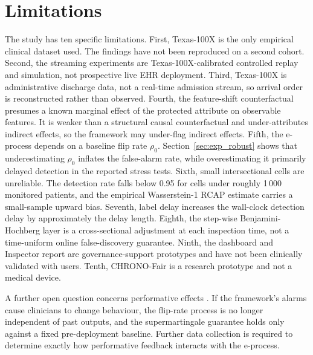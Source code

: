 \documentclass[acmsmall,nonacm,review,anonymous]{acmart}
\newcommand{\1}[1]{\mathbf{1}\!\left\{#1\right\}}
\begin{document}
\section{Limitations}\label{sec:limitations}

The study has ten specific limitations. First, Texas-100X is the only empirical clinical dataset used. The findings have not been reproduced on a second cohort. Second, the streaming experiments are Texas-100X-calibrated controlled replay and simulation, not prospective live EHR deployment. Third, Texas-100X is administrative discharge data, not a real-time admission stream, so arrival order is reconstructed rather than observed. Fourth, the feature-shift counterfactual presumes a known marginal effect of the protected attribute on observable features. It is weaker than a structural causal counterfactual and under-attributes indirect effects, so the framework may under-flag indirect effects. Fifth, the e-process depends on a baseline flip rate $\rho_0$. Section~\ref{sec:exp_robust} shows that underestimating $\rho_0$ inflates the false-alarm rate, while overestimating it primarily delayed detection in the reported stress tests. Sixth, small intersectional cells are unreliable. The detection rate falls below 0.95 for cells under roughly 1\,000 monitored patients, and the empirical Wasserstein-1 RCAP estimate carries a small-sample upward bias. Seventh, label delay increases the wall-clock detection delay by approximately the delay length. Eighth, the step-wise Benjamini-Hochberg layer is a cross-sectional adjustment at each inspection time, not a time-uniform online false-discovery guarantee. Ninth, the dashboard and Inspector report are governance-support prototypes and have not been clinically validated with users. Tenth, CHRONO-Fair is a research prototype and not a medical device.

A further open question concerns performative effects \cite{perdomo2020}. If the framework's alarms cause clinicians to change behaviour, the flip-rate process is no longer independent of past outputs, and the supermartingale guarantee holds only against a fixed pre-deployment baseline. Further data collection is required to determine exactly how performative feedback interacts with the e-process.
\end{document}
